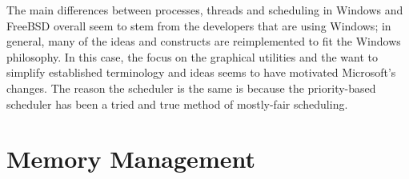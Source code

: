 \documentclass[titlepage]{article}
\begin{document}
\begin{singlespace}
    The main differences between processes, threads and scheduling in Windows and FreeBSD overall seem to stem from the developers that are using Windows; in general, many of the ideas and constructs are reimplemented to fit the Windows philosophy. In this case, the focus on the graphical utilities and the want to simplify established terminology and ideas seems to have motivated Microsoft's changes. The reason the scheduler is the same is because the priority-based scheduler has been a tried and true method of mostly-fair scheduling.\\

\end{singlespace}

\section{Memory Management}
\end{document}
